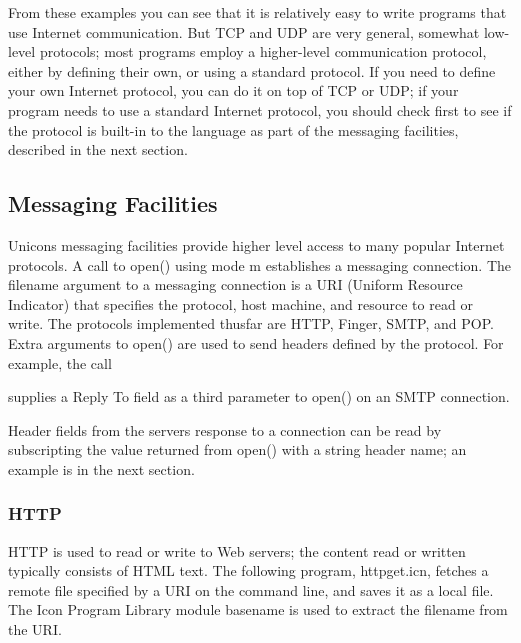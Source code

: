From these examples you can see that it is relatively easy to write
programs that use Internet communication. But TCP and UDP are very
general, somewhat low-level protocols; most programs employ a
higher-level communication protocol, either by defining their own, or
using a standard protocol. If you need to define your own Internet
protocol, you can do it on top of TCP or UDP; if your program needs to
use a standard Internet protocol, you should check first to see if the
protocol is built-in to the language as part of the messaging
facilities, described in the next section.

\subsection{Messaging Facilities}

Unicon{\textquotesingle}s messaging facilities provide
higher level access to many popular Internet protocols. A call to
\textsf{open()} using mode \textsf{{\textquotedbl}m{\textquotedbl}}
establishes a messaging connection. The filename argument to a
messaging connection is a URI (Uniform Resource Indicator) that
specifies the protocol, host machine, and resource to read or write.
The protocols implemented thusfar are HTTP, Finger, SMTP, and POP.
Extra arguments to open() are used to send headers defined by the
protocol. For example, the call


\noindent
supplies a Reply To field as a third parameter to \textsf{open()} on an
SMTP connection.

Header fields from the server{\textquotesingle}s response to a
connection can be read by subscripting the value returned from
\textsf{open()} with a string header name; an example is in the next
section.

\subsubsection{HTTP}

HTTP is used to read or write to Web servers; the content
read or written typically consists of HTML text. The
following program, \textsf{httpget.icn}, fetches a remote file
specified by a URI on the command line, and saves it as a local file.
The Icon Program Library module \textsf{basename} is used to extract
the filename from the URI.

